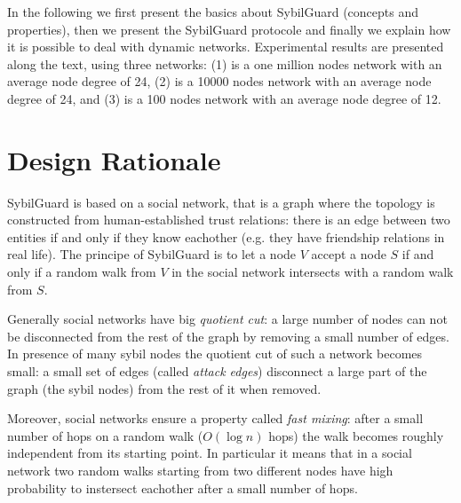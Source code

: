 \documentclass[a4paper,11pt]{article}
\begin{document}

In the following we first present the basics about SybilGuard (concepts and properties), then we present the SybilGuard protocole and finally we explain how it is possible to deal with dynamic networks.
Experimental results are presented along the text, using three networks: (1) is a one million nodes network with an average node degree of 24, (2) is a 10000 nodes network with an average node degree of 24, and (3) is a 100 nodes network with an average node degree of 12.

\section{Design Rationale}


SybilGuard is based on a social network, that is a graph where the topology is constructed from human-established trust relations: there is an edge between two entities if and only if they know eachother (e.g. they have friendship relations in real life).
The principe of SybilGuard is to let a node $V$ accept a node $S$ if and only if a random walk from $V$ in the social network intersects with a random walk from $S$.

Generally social networks have  big \emph{quotient cut}: a large number of nodes can not be disconnected from the rest of the graph by removing a small number of edges.
In presence of many sybil nodes the quotient cut of such a network becomes small: a small set of edges (called \emph{attack edges}) disconnect a large part of the graph (the sybil nodes) from the rest of it when removed.

Moreover, social networks ensure a property called \emph{fast mixing}: after a small number of hops on a random walk ($O(\log n)$ hops) the walk becomes roughly independent from its starting point.
In particular it means that in a social network two random walks starting from two different nodes have high probability to instersect eachother after a small number of hops.
\end{document}

